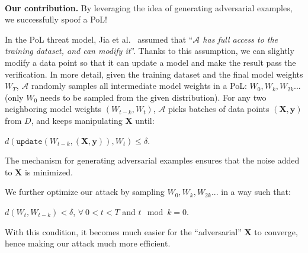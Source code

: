 \documentclass[conference]{IEEEtran}
\newcommand{\Adv}{\mathcal{A}\xspace}
\newcommand{\XX}{\mathbf{X}\xspace}
\newcommand{\yy}{\mathbf{y}\xspace}
\newcommand{\Paragraph}[1]{~\vspace*{-0.8\baselineskip}\\{\bf #1}}
\begin{document}
\Paragraph{Our contribution.}
By {leveraging\EndAccSupp{}} the idea of {generating\EndAccSupp{}} {adversarial\EndAccSupp{}} examples, we {successfully\EndAccSupp{}} {spoof\EndAccSupp{}} a PoL!

In the PoL threat model, Jia {et\EndAccSupp{}} al.~\cite{PoL} assumed that ``{\em $\Adv$ has full access to the training dataset, and can modify it}''.
Thanks to this assumption, we can slightly {modify\EndAccSupp{}} a {data\EndAccSupp{}} point so that it can update a {model\EndAccSupp{}} and make the {result\EndAccSupp{}} pass the verification. 
In more detail, given the training {dataset\EndAccSupp{}} and the final {model\EndAccSupp{}} weights $W_T$, 
$\Adv$ randomly {samples\EndAccSupp{}} all intermediate {model\EndAccSupp{}} weights in a PoL: $W_0, W_k, W_{2k} ...$ (only $W_0$ needs to be {sampled\EndAccSupp{}} from the given distribution).
For any two neighboring model weights 
$(W_{t-k}, W_{t})$,
$\Adv$ picks batches of {data\EndAccSupp{}} points $(\mathbf{X}, \mathbf{y})$ from $D$,
and keeps manipulating $\mathbf{X}$ until:
\begin{center}
    $d(\texttt{update}(W_{t-k}, (\XX, \yy)), W_{t}) \leq \delta$.
\end{center}
The mechanism for generating {adversarial\EndAccSupp{}} examples ensures that the {noise\EndAccSupp{}} added to $\XX$ is minimized.

We further {optimize\EndAccSupp{}} our {attack\EndAccSupp{}} by {sampling\EndAccSupp{}} $W_0, W_k, W_{2k} ...$ in a way such that:
\begin{center}
    $d(W_t, W_{t-k}) < \delta$,  $\forall~0 < t < T$ and $t\mod k =0$.
\end{center}
With this condition, it becomes much easier for the ``adversarial'' $\XX$ to converge,
{hence\EndAccSupp{}} making our {attack\EndAccSupp{}} much more efficient.
\end{document}
